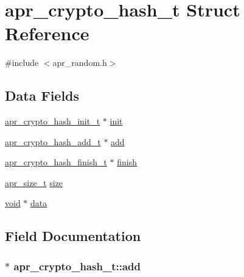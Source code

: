 \hypertarget{structapr__crypto__hash__t}{}\section{apr\+\_\+crypto\+\_\+hash\+\_\+t Struct Reference}
\label{structapr__crypto__hash__t}


{\ttfamily \#include $<$apr\+\_\+random.\+h$>$}

\subsection*{Data Fields}
\begin{DoxyCompactItemize}
\item 
\hyperlink{group__apr__random_gad2775bc1cdb376d9dec0e97283b4bdd9}{apr\+\_\+crypto\+\_\+hash\+\_\+init\+\_\+t} $\ast$ \hyperlink{structapr__crypto__hash__t_a3b0a8b85bc2207235024a9e64febab69}{init}
\item 
\hyperlink{group__apr__random_ga2f8a4fb18078a76357327ea55936c1ea}{apr\+\_\+crypto\+\_\+hash\+\_\+add\+\_\+t} $\ast$ \hyperlink{structapr__crypto__hash__t_a60c77281aca26fdb500c3ef899908abb}{add}
\item 
\hyperlink{group__apr__random_gab70ea9133870efdb5532d20d4bcf7442}{apr\+\_\+crypto\+\_\+hash\+\_\+finish\+\_\+t} $\ast$ \hyperlink{structapr__crypto__hash__t_abd6933f64b61c595788ddf0f16d5b48c}{finish}
\item 
\hyperlink{group__apr__platform_gaaa72b2253f6f3032cefea5712a27540e}{apr\+\_\+size\+\_\+t} \hyperlink{structapr__crypto__hash__t_ade59f47b349e3a9eef98097fb87fbf72}{size}
\item 
\hyperlink{group__MOD__ISAPI_gacd6cdbf73df3d9eed42fa493d9b621a6}{void} $\ast$ \hyperlink{structapr__crypto__hash__t_a0211f5be5ddce65dee1ea0720d39e8e3}{data}
\end{DoxyCompactItemize}


\subsection{Field Documentation}
\subsubsection[{\texorpdfstring{add}{add}}]{$\ast$ apr\+\_\+crypto\+\_\+hash\+\_\+t\+::add}\hypertarget{structapr__crypto__hash__t_a60c77281aca26fdb500c3ef899908abb}{}\label{structapr__crypto__hash__t_a60c77281aca26fdb500c3ef899908abb}
